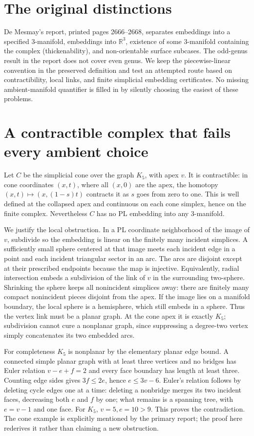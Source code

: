 \documentclass[11pt]{article}
\begin{document}
\section{The original distinctions}
De Mesmay's report, printed pages 2666--2668, separates embeddings into a
specified 3-manifold, embeddings into $\mathbb R^3$, existence of some
3-manifold containing the complex (thickenability), and non-orientable surface
subcases. The odd-genus result in the report does not cover even genus.
We keep the piecewise-linear convention in the preserved definition and test
an attempted route based on contractibility, local links, and finite
simplicial embedding certificates. No missing ambient-manifold quantifier is
filled in by silently choosing the easiest of these problems.

\section{A contractible complex that fails every ambient choice}
Let $C$ be the simplicial cone over the graph $K_5$, with apex $v$.
It is contractible: in cone coordinates $(x,t)$, where all $(x,0)$ are the
apex, the homotopy $(x,t)\mapsto(x,(1-s)t)$ contracts it as $s$ goes from
zero to one. This is well defined at the collapsed apex and continuous on
each cone simplex, hence on the finite complex.
Nevertheless $C$ has no PL embedding into any 3-manifold.

We justify the local obstruction. In a PL coordinate neighborhood of the
image of $v$, subdivide so the embedding is linear on the finitely many
incident simplices. A sufficiently small sphere centered at that image
meets each incident edge in a point and each incident triangular sector in
an arc. The arcs are disjoint except at their prescribed endpoints because
the map is injective. Equivalently, radial intersection embeds a subdivision
of the link of $v$ in the surrounding two-sphere. Shrinking the sphere keeps
all nonincident simplices away: there are finitely many compact nonincident
pieces disjoint from the apex. If the image lies on a manifold boundary,
the local sphere is a hemisphere, which still embeds in a sphere. Thus the
vertex link must be a planar graph. At the cone apex it is exactly $K_5$;
subdivision cannot cure a nonplanar graph, since suppressing a degree-two
vertex simply concatenates its two embedded arcs.

For completeness $K_5$ is nonplanar by the elementary planar edge bound.
A connected simple planar graph with at least three vertices and no bridges
has Euler relation $v-e+f=2$ and every face boundary has length at least
three. Counting edge sides gives $3f\le2e$, hence $e\le3v-6$.
Euler's relation follows by deleting cycle edges one at a time: deleting a
nonbridge merges its two incident faces, decreasing both $e$ and $f$ by one;
what remains is a spanning tree, with $e=v-1$ and one face.
For $K_5$, $v=5,e=10>9$. This proves the contradiction.
The cone example is explicitly mentioned by the primary report; the proof
here rederives it rather than claiming a new obstruction.
\end{document}
